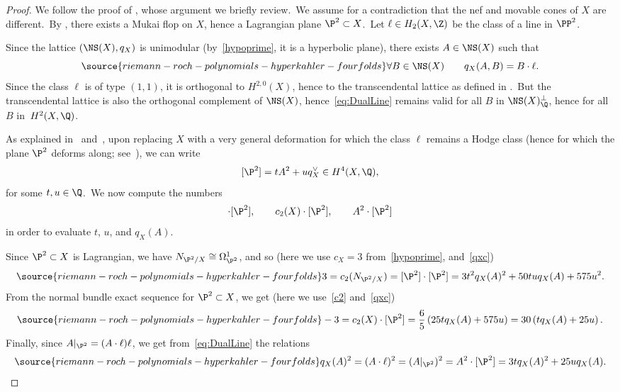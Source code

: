 \begin{proof}
We follow the proof of \cite[Theorem~22]{hats}, whose argument we briefly review.\
We assume for a contradiction that the nef and movable cones of $X$ are different.\
By \cite[Theorem 1.1]{wiwi}, there exists a Mukai flop on $X$, hence a Lagrangian plane $\P^2\subset X$.\
Let $\ell\in H_2(X,\Z)$ be the class of a line in $ \PP^2$.

Since the lattice $(\NS(X),q_X)$ is unimodular (by~\eqref{hypoprime}, it is a hyperbolic plane), there exists \mbox{$A\in\NS(X)$} such that
\begin{equation}\label{eq:DualLine}
\source{riemann-roch-polynomials-hyperkahler-fourfolds}
\forall B\in  \NS(X)\qquad q_X(A,B) =  B\cdot \ell.
\end{equation}
Since the class $\ell$ is of type $(1,1)$, it is orthogonal to $H^{2,0}(X)$, hence to the transcendental lattice  as defined in \cite[Definition~3.2.5]{huyk3}.\
But the transcendental lattice is also the orthogonal complement of $\NS(X)$, hence~\eqref{eq:DualLine} remains valid for all $B$ in $\NS(X)^\perp_\Q$, hence for all $B$ in~$H^2(X,\Q)$.

As explained in~\cite[(8)]{hats} and~\cite[Section~3]{og1}, upon replacing $X$ with a very general deformation for which the class $\ell$ remains a Hodge class (hence for which the plane $\P^2$ deforms along; see~\cite{voi}), we can write
\[
[\P^2] = t A^2 + u q_X^\vee \in H^4(X,\Q),
\]
for some $t,u\in\Q$.\
We now compute the numbers
\begin{equation*}
[\P^2]\cdot[\P^2],\qquad c_2(X)\cdot [\P^2],\qquad A^2\cdot [\P^2]
\end{equation*}
in order to evaluate $t$, $u$, and $q_X(A)$.\

Since $\P^2\subset X$ is Lagrangian, we have $N_{\P^2/X}\cong\Omega^1_{\P^2}$, and so (here we use $c_X=3$ from~\eqref{hypoprime}, and~\eqref{qxc})
\begin{equation}\label{eq:NefCone4folds1}
\source{riemann-roch-polynomials-hyperkahler-fourfolds}
3 = c_2(N_{\P^2/X}) = [\P^2]\cdot [\P^2] = 3 t^2 q_X(A)^2 + 50 t u q_X(A) + 575 u^2.
\end{equation}
From the normal bundle exact sequence for $\P^2\subset X$, we get (here we use~\eqref{c2} and~\eqref{qxc})
\begin{equation}\label{eq:NefCone4folds2}
\source{riemann-roch-polynomials-hyperkahler-fourfolds}
-3 = c_2(X)\cdot [\P^2] = \frac 65 \left( 25 t q_X(A) + 575 u \right)= 30 \left(t q_X(A) +  25 u \right).
\end{equation}
Finally, since $A\vert_{\P^2} = (A\cdot \ell)\ell$, we get from~\eqref{eq:DualLine} the relations
\begin{equation}\label{eq:NefCone4folds3}
\source{riemann-roch-polynomials-hyperkahler-fourfolds}
q_X(A)^2  =  (A\cdot \ell)^2=  (A\vert_{\P^2})^2 = A^2\cdot [\P^2] =  3 t q_X(A)^2 + 25 u q_X(A).
\end{equation}


\end{proof}
